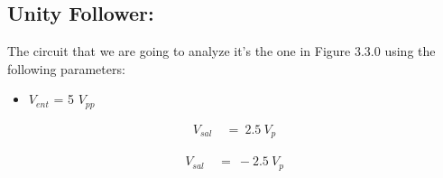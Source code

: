 \subsection{Unity Follower:}

The circuit that we are going to analyze it's the one in Figure 3.3.0 using the following parameters: \hfill \break

{\bfseries
\begin{itemize}
\item $V_{ent}$ = 5 $V_{pp}$
\end{itemize}} \hfill

\begin{flushright}
{\bfseries\itshape{}} \hfill \break
\end{flushright}

{\bfseries\itshape{}} 

\begin{ceqn}
\begin{align*}
V_{sal}\ &=\ 2.5\ V_{p}
\end{align*}
\end{ceqn} \hfill \break

{\bfseries\itshape{}} 

\begin{ceqn}
\begin{align*}
V_{sal}\ &=\ -2.5\ V_{p}
\end{align*}
\end{ceqn} \hfill \break

{\bfseries\itshape{}} \hfill \break

\pagebreak